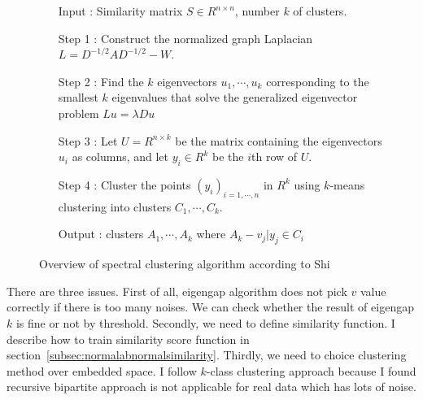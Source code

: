\begin{figure}[ht]
\begin{mdframed}
\begin{enumerate}
\item[Input] : Similarity matrix $S \in R^{n \times n}$, number $k$ of clusters. \\
\item[Step 1] : Construct the normalized graph Laplacian $L = D^{-1/2} A D^{-1/2} - W$.
\item[Step 2] : Find the $k$ eigenvectors $u_1, \cdots, u_k$ corresponding to the smallest $k$ eigenvalues that solve the generalized eigenvector problem $L u = \lambda D u$ \\
\item[Step 3] : Let $U = R^{n \times k}$ be the matrix containing the eigenvectors $u_i$ as columns, and let $y_i \in R^k$ be the $i$th row of $U$.\\
\item[Step 4] : Cluster the points $(y_i)_{i=1,\cdots,n}$ in $R^k$ using $k$-means clustering into clusters $C_1,\cdots,C_k$.\\
\item[Output] : clusters $A_1, \cdots, A_k$ where $A_k - {v_j|y_j \in C_i}$
\end{enumerate}
\end{mdframed}
\caption{Overview of spectral clustering algorithm according to Shi}
\end{figure}

There are three issues. 
First of all, eigengap algorithm does not pick $v$ value correctly if there is too many noises. 
We can check whether the result of eigengap $k$ is fine or not by threshold. 
Secondly, we need to define similarity function. 
I describe how to train similarity score function in section~\ref{subsec:normalabnormalsimilarity}. 
Thirdly, we need to choice clustering method over embedded space. 
I follow $k$-class clustering approach because I found recursive bipartite approach is not applicable for real data which has lots of noise. 
